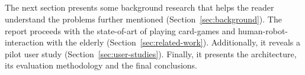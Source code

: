 \subsection*{\centering*}

The next section presents some background research that helps the reader understand the problems further mentioned (Section~\ref{sec:background}).
The report proceeds with the state-of-art of playing card-games and human-robot-interaction with the elderly (Section~\ref{sec:related-work}).
Additionally, it reveals a pilot user study (Section~\ref{sec:user-studies}).
Finally, it presents the architecture, its evaluation methodology and the final conclusions.
